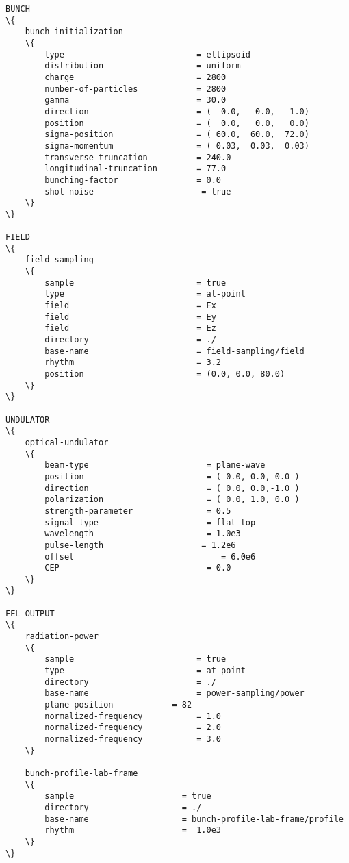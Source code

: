 \begin{appendices}
\begin{snugshade}
\begin{Verbatim}[fontsize=\footnotesize, tabsize=4, fontfamily=courier, fontseries=b, commandchars=\\\{\}, obeytabs]
BUNCH
\{
	bunch-initialization
	\{
		type                           = ellipsoid
		distribution                   = uniform
		charge                         = 2800
		number-of-particles            = 2800
		gamma                          = 30.0
		direction                      = (  0.0,   0.0,   1.0)
		position                       = (  0.0,   0.0,   0.0)
		sigma-position                 = ( 60.0,  60.0,  72.0)
		sigma-momentum                 = ( 0.03,  0.03,  0.03)
		transverse-truncation          = 240.0
		longitudinal-truncation        = 77.0
		bunching-factor                = 0.0
		shot-noise						= true
	\}
\}

FIELD
\{
	field-sampling
	\{
		sample                         = true
		type                           = at-point
		field                          = Ex
		field                          = Ey
		field                          = Ez
		directory                      = ./
		base-name                      = field-sampling/field
		rhythm                         = 3.2
		position                       = (0.0, 0.0, 80.0)
	\}
\}

UNDULATOR
\{
	optical-undulator
	\{
		beam-type                        = plane-wave
		position                         = ( 0.0, 0.0, 0.0 )
		direction                        = ( 0.0, 0.0,-1.0 )
		polarization                     = ( 0.0, 1.0, 0.0 )
		strength-parameter               = 0.5
		signal-type                      = flat-top
		wavelength                       = 1.0e3
		pulse-length                    = 1.2e6
		offset 								= 6.0e6
		CEP                              = 0.0
	\}
\}

FEL-OUTPUT
\{
	radiation-power
	\{
		sample                         = true
		type                           = at-point
		directory                      = ./
		base-name                      = power-sampling/power
		plane-position            = 82
		normalized-frequency           = 1.0
		normalized-frequency           = 2.0
		normalized-frequency           = 3.0
	\}
	
	bunch-profile-lab-frame
	\{
		sample						= true
		directory					= ./
		base-name					= bunch-profile-lab-frame/profile
		rhythm						=  1.0e3
	\}
\}
\end{Verbatim}
\end{snugshade}

\end{appendices}